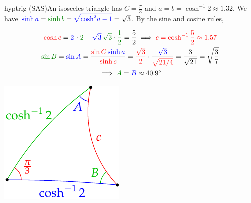 \goodbreak


\begin{examples}{}{hyptrig}
	\exstart (SAS)\quad An isosceles triangle has $C=\frac{\pi}3$ and $a=b=\cosh^{-1}2\approx 1.32$. We have $\textcolor{blue}{\sinh a}=\textcolor{Green}{\sinh b} = \textcolor{blue}{\sqrt{\cosh^2\!a-1}}=\sqrt 3$. By the sine and cosine rules,
	\begin{enumerate}\setcounter{enumi}{1}
	  \begin{minipage}[t]{0.69\linewidth}\vspace{-12pt}
	  	\item[] 
			\begin{gather*}
				\textcolor{red}{\cosh c} = \textcolor{blue}{2} \, \cdot \textcolor{Green}{2} -\textcolor{blue}{\sqrt 3} \, \textcolor{Green}{\sqrt 3}\cdot \textcolor{Green}{\frac 12} =\frac 52\implies \textcolor{red}{c=\cosh^{-1}\frac 52\approx 1.57}\\
				\textcolor{Green}{\sin B}=\textcolor{blue}{\sin A}=\frac{\textcolor{red}{\sin C} \, \textcolor{blue}{\sinh a}}{\textcolor{red}{\sinh c}} = \textcolor{red}{\frac{\sqrt 3}2}\cdot\frac{\textcolor{blue}{\sqrt 3}}{\textcolor{red}{\sqrt{21/4}}} =\frac 3{\sqrt{21}}=\sqrt{\frac 37}\\
				\implies \textcolor{Green}{A}=\textcolor{blue}{B}\approx \ang{40.9}
			\end{gather*}
	  \end{minipage}
	  \hfill
	  \begin{minipage}[t]{0.3\linewidth}\vspace{-27pt}
	  	\flushright\includegraphics[scale=0.95]{isom-trigsas}
	  \end{minipage}


\end{enumerate}
\end{examples}
